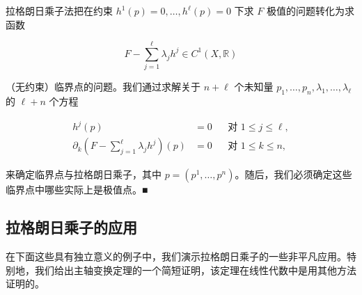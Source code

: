 \begin{remark}

拉格朗日乘子法把在约束 $ h^{1}(p) = 0, \ldots, h^{\ell}(p) = 0 $ 下求 $ F $ 极值的问题转化为求函数

\[
F - \sum_{j=1}^{\ell}\lambda_{j}h^{j} \in C^{1}(X,\mathbb{R})
\]

（无约束）临界点的问题。我们通过求解关于 $ n + \ell $ 个未知量 $ p_{1}, \ldots, p_{n}, \lambda_{1}, \ldots, \lambda_{\ell} $ 的 $ \ell + n $ 个方程

\begin{equation*}
\begin{aligned}
h^{j}(p) &= 0 && \text{对 } 1 \le j \le \ell , \\ \partial_{k}\left(F - \sum_{j=1}^{\ell}\lambda_{j}h^{j}\right)(p) &= 0 && \text{对 } 1 \le k \le n ,
\end{aligned}
\end{equation*}

来确定临界点与拉格朗日乘子，其中 $ p = (p^{1}, \ldots, p^{n}) $。随后，我们必须确定这些临界点中哪些实际上是极值点。\nobreak\hspace{0.35em}■

\end{remark}

\subsection*{拉格朗日乘子的应用}

在下面这些具有独立意义的例子中，我们演示拉格朗日乘子的一些非平凡应用。特别地，我们给出主轴变换定理的一个简短证明，该定理在线性代数中是用其他方法证明的。


